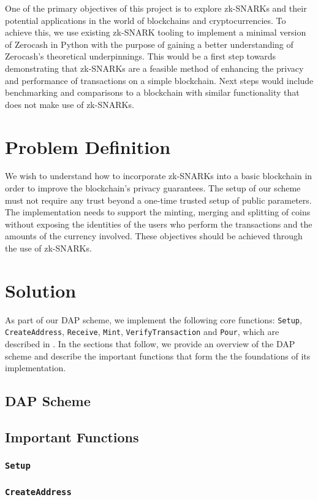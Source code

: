 \documentclass{article}
\begin{document}
One of the primary objectives of this project is to explore zk-SNARKs and their potential applications in the world of blockchains and cryptocurrencies. To achieve this, we use existing zk-SNARK tooling to implement a minimal version of Zerocash in Python with the purpose of gaining a better understanding of Zerocash's theoretical underpinnings. This would be a first step towards demonstrating that zk-SNARKs are a feasible method of enhancing the privacy and performance of transactions on a simple blockchain. Next steps would include benchmarking and comparisons to a blockchain with similar functionality that does not make use of zk-SNARKs.

\section{Problem Definition}
We wish to understand how to incorporate zk-SNARKs into a basic blockchain in order to improve the blockchain's privacy guarantees. The setup of our scheme must not require any trust beyond a one-time trusted setup of public parameters. The implementation needs to support the minting, merging and splitting of coins without exposing the identities of the users who perform the transactions and the amounts of the currency involved. These objectives should be achieved through the use of zk-SNARKs.

\section{Solution}
As part of our DAP scheme, we implement the following core functions: \texttt{Setup}, \texttt{CreateAddress}, \texttt{Receive}, \texttt{Mint}, \texttt{VerifyTransaction} and \texttt{Pour}, which are described in \cite{zerocash}. In the sections that follow, we provide an overview of the DAP scheme and describe the important functions that form the the foundations of its implementation.

\subsection{DAP Scheme}
\subsection{Important Functions}
\subsubsection{\texttt{Setup}}
\subsubsection{\texttt{CreateAddress}}
\end{document}
